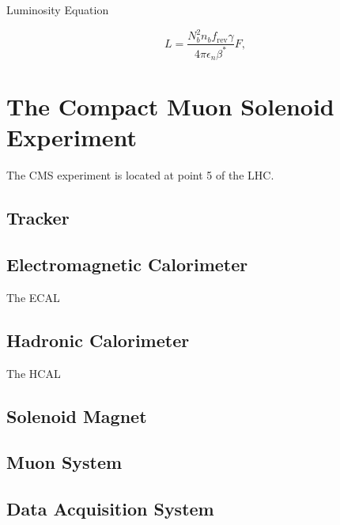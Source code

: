 Luminosity Equation

\begin{equation}
L=\frac{N_{b}^{2}n_{b}f_{\text{rev}}\gamma}{4\pi\epsilon_{n}\beta^{*}}F,
\end{equation}

\section{The Compact Muon Solenoid Experiment}
\label{SECTION:ExperimentalApparatus_CMS}

The \gls{CMS} experiment is located at point 5 of the \gls{LHC}.





\subsection{Tracker}
\label{SUBSECTION:ExperimentalApparatus_CMS_Tracker}

\subsection{Electromagnetic Calorimeter}
\label{SUBSECTION:ExperimentalApparatus_CMS_ECAL}

The \gls{ECAL} 


\subsection{Hadronic Calorimeter}
\label{SUBSECTION:ExperimentalApparatus_CMS_HCAL}

The \gls{HCAL}

\subsection{Solenoid Magnet}
\label{SUBSECTION:ExperimentalApparatus_CMS_Magnet}



\subsection{Muon System}
\label{SUBSECTION:ExperimentalApparatus_CMS_Mouns}

\subsection{Data Acquisition System}
\label{SUBSECTION:ExperimentalApparatus_CMS_DAQ}

